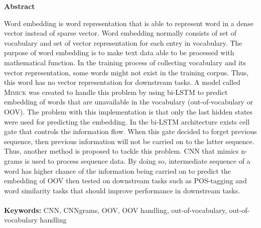 \documentclass[a4paper,12pt]{report}
\newcommand{\linespacing}{1.5}
\renewcommand{\baselinestretch}{\linespacing}
\begin{document}





\newpage
{}
\tableofcontents

\newpage
\pagebreak
\hspace{0pt}
\vfill
\begin{center}
	\textbf{Abstract}
\end{center}
\par Word embedding is word representation that is able to represent
word in a dense vector instead of sparse vector. Word embedding
normally consists of set of vocabulary and set of vector
representation for each entry in vocabulary. The purpose of word
embedding is to make text data able to be processed with mathematical
function. In the training process of collecting vocabulary and its
vector representation, some words might not exist in the training
corpus. Thus, this word has no vector representation for downstream
tasks. A model called \textsc{Mimick} was created to handle this
problem by using bi-LSTM to predict embedding of words that are
unavailable in the vocabulary (out-of-vocabulary or OOV). The problem
with this implementation is that only the last hidden states were used
for predicting the embedding. In the bi-LSTM architecture exists cell
gate that controls the information flow. When this gate decided to
forget previous sequence, then previous information will not be
carried on to the latter sequence. Thus, another method is proposed to
tackle this problem. CNN that mimics n-grams is used to process
sequence data. By doing so, intermediate sequence of a word has higher
chance of the information being carried on to predict the embedding of
OOV then tested on downstream tasks such as POS-tagging and word
similarity tasks that should improve performance in downstream tasks.
\\~\\
\textbf{Keywords:} CNN, CNNgrams, OOV, OOV handling,
out-of-vocabulary, out-of-vocabulary handling
\vfill
\hspace{0pt}
\pagebreak
\end{document}
